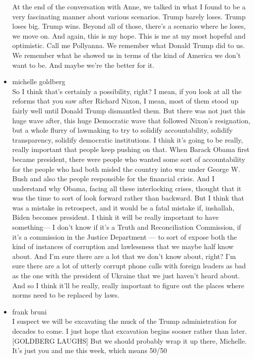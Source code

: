\begin{itemize}
  At the end of the conversation with Anne, we talked in what I found to
  be a very fascinating manner about various scenarios. Trump barely
  loses. Trump loses big. Trump wins. Beyond all of those, there's a
  scenario where he loses, we move on. And again, this is my hope. This
  is me at my most hopeful and optimistic. Call me Pollyanna. We
  remember what Donald Trump did to us. We remember what he showed us in
  terms of the kind of America we don't want to be. And maybe we're the
  better for it.
\item
  michelle goldberg\\
  So I think that's certainly a possibility, right? I mean, if you look
  at all the reforms that you saw after Richard Nixon, I mean, most of
  them stood up fairly well until Donald Trump dismantled them. But
  there was not just this huge wave after, this huge Democratic wave
  that followed Nixon's resignation, but a whole flurry of lawmaking to
  try to solidify accountability, solidify transparency, solidify
  democratic institutions. I think it's going to be really, really
  important that people keep pushing on that. When Barack Obama first
  became president, there were people who wanted some sort of
  accountability for the people who had both misled the country into war
  under George W. Bush and also the people responsible for the financial
  crisis. And I understand why Obama, facing all these interlocking
  crises, thought that it was the time to sort of look forward rather
  than backward. But I think that was a mistake in retrospect, and it
  would be a fatal mistake if, inshallah, Biden becomes president. I
  think it will be really important to have something--- I don't know if
  it's a Truth and Reconciliation Commission, if it's a commission in
  the Justice Department --- to sort of expose both the kind of
  instances of corruption and lawlessness that we maybe half know about.
  And I'm sure there are a lot that we don't know about, right? I'm sure
  there are a lot of utterly corrupt phone calls with foreign leaders as
  bad as the one with the president of Ukraine that we just haven't
  heard about. And so I think it'll be really, really important to
  figure out the places where norms need to be replaced by laws.
\item
  frank bruni\\
  I suspect we will be excavating the muck of the Trump administration
  for decades to come. I just hope that excavation begins sooner rather
  than later. {[}GOLDBERG LAUGHS{]} But we should probably wrap it up
  there, Michelle. It's just you and me this week, which means 50/50

\end{itemize}
